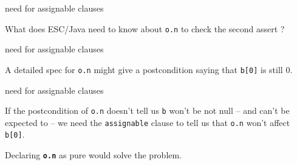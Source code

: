 \documentclass[
pdf,
nocolorBG,
slideColor,
cok,
]{prosper}
\newcommand{\code}[1]{{\rm \texttt{\textbf{\scriptsize #1}}}}
\begin{document}
\begin{slide}{need for assignable clauses}
\vspace*{-6ex}


What does ESC/Java need to know about \texttt{o.n} to check the second assert ?

\end{slide}


\begin{slide}{need for assignable clauses}
\vspace*{-6ex}


A detailed spec for \texttt{o.n} might give a postcondition saying
that \texttt{b[0]} is still 0.

\end{slide}


\begin{slide}{need for assignable clauses}
\vspace*{-6ex}


If the postcondition of \texttt{o.n} doesn't tell us \texttt{b} won't be not null
-- and can't be expected to -- we need the \texttt{assignable} clause to
tell us that \texttt{o.n} won't affect \texttt{b[0]}.

\medskip

{\scriptsize Declaring \texttt{\textbf{o.n}} as pure would solve the problem.}


\end{slide}
\end{document}
